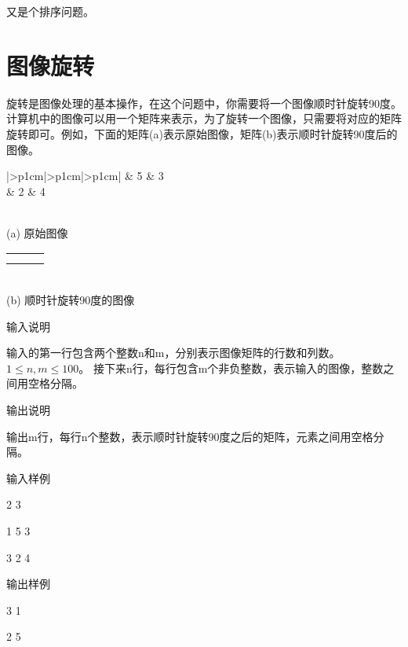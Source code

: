 \begin{note}[要点]
	又是个排序问题。
\end{note}

\section{图像旋转}	
旋转是图像处理的基本操作，在这个问题中，你需要将一个图像顺时针旋转90度。
计算机中的图像可以用一个矩阵来表示，为了旋转一个图像，只需要将对应的矩阵旋转即可。例如，下面的矩阵(a)表示原始图像，矩阵(b)表示顺时针旋转90度后的图像。

\begin{minipage}[h]{0.4\linewidth}
	\centering
	\begin{tabular}{|>{\centering\arraybackslash}p{1cm}|>{\centering\arraybackslash}p{1cm}|>{\centering\arraybackslash}p{1cm}|}
		 & 5 & 3 \\ 
		 & 2 & 4 \\ 
		\hline 
	\end{tabular} \\ 
    \medskip
	(a) 原始图像
\end{minipage}
\begin{minipage}[h]{0.4\linewidth}
	\centering
	\begin{tabular}{|>{\centering\arraybackslash}p{1cm}|>{\centering\arraybackslash}p{1cm}|>{\centering\arraybackslash}p{1cm}|}
		\hline 
		3 & 1 \\ 
		\hline 
		2 & 5 \\ 
		\hline
		4 & 3 \\
		\hline 
	\end{tabular} \\
    \medskip
	(b) 顺时针旋转90度的图像
\end{minipage}

输入说明	

输入的第一行包含两个整数n和m，分别表示图像矩阵的行数和列数。$1\le n, m\le 100$。
接下来n行，每行包含m个非负整数，表示输入的图像，整数之间用空格分隔。

输出说明
	
输出m行，每行n个整数，表示顺时针旋转90度之后的矩阵，元素之间用空格分隔。

输入样例
	
2 3

1 5 3

3 2 4

输出样例
	
3 1

2 5

